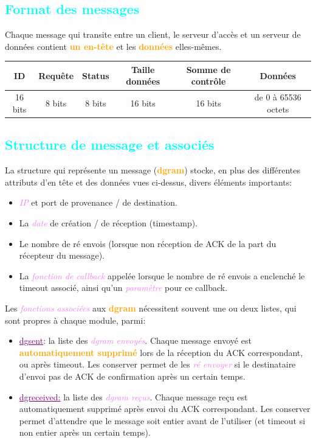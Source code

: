 \documentclass[a4paper]{article}
\let\oldsubsection\subsection{}
\renewcommand{\subsection}[1]{\textcolor{cyan}{\oldsubsection{#1}}}
\let\oldtextbf\textbf
\renewcommand{\textbf}[1]{\textcolor{orange}{\oldtextbf{#1}}}
\let\oldunderline\underline{}
\renewcommand{\underline}[1]{\textcolor{purple}{\oldunderline{#1}}}
\let\oldtextit\textit
\renewcommand{\textit}[1]{\textcolor{violet}{\oldtextit{#1}}}
\begin{document}
\subsection{Format des messages}

Chaque message qui transite entre un client, le serveur d'accès et un serveur de données contient \textbf{un en-tête} et les \textbf{données} elles-mêmes.

\begin{tabular}{|c|c|c|c|c|c|}
    \hline
    ID & Requête & Status & Taille données & Somme de contrôle & Données\\
    \hline
    16 bits & 8 bits & 8 bits & 16 bits & 16 bits & de 0 à 65536 octets\\
    \hline
\end{tabular}

\subsection{Structure de message et associés}

La structure qui représente un message (\textbf{dgram}) stocke, en plus des différentes attributs d'en tête et des données vues ci-dessus, divers éléments importants:
\begin{itemize}
    \item \textit{IP} et port de provenance / de destination.
    \item La \textit{date} de création / de réception (timestamp).
    \item Le nombre de ré envois (lorsque non réception de ACK de la part du récepteur du message).
    \item La \textit{fonction de callback} appelée lorsque le nombre de ré envois a enclenché le timeout associé, ainsi qu'un \textit{paramètre} pour ce callback.
\end{itemize}

Les \textit{fonctions associées} aux \textbf{dgram} nécessitent souvent une ou deux listes, qui sont propres à chaque module, parmi:
\begin{itemize}
    \item \underline{dgsent}: la liste des \textit{dgram envoyés}. Chaque message envoyé est \textbf{automatiquement supprimé} lors de la réception du ACK correspondant, ou après timeout. Les conserver permet de les \textit{ré envoyer} si le destinataire d'envoi pas de ACK de confirmation après un certain temps.
    \item \underline{dgreceived:} la liste des \textit{dgram reçus}. Chaque message reçu est automatiquement supprimé après envoi du ACK correspondant. Les conserver permet d'attendre que le message soit entier avant de l'utiliser (et timeout si non entier après un certain temps).
\end{itemize}
\end{document}
